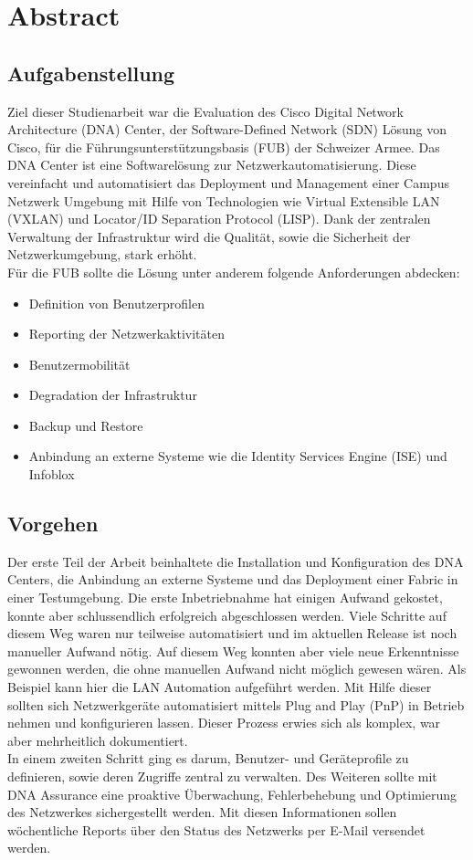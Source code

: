 \section{Abstract} 

\subsection{Aufgabenstellung} \label{Abstract}
Ziel dieser Studienarbeit war die Evaluation des Cisco Digital Network Architecture (DNA) Center, der Software-Defined Network (SDN) Lösung von Cisco, für die Führungsunterstützungsbasis (FUB) der Schweizer Armee. Das DNA Center ist eine Softwarelösung zur Netzwerkautomatisierung. Diese vereinfacht und automatisiert das Deployment und Management einer Campus Netzwerk Umgebung mit Hilfe von Technologien wie Virtual Extensible LAN (VXLAN) und Locator/ID Separation Protocol (LISP). Dank der zentralen Verwaltung der Infrastruktur wird die Qualität, sowie die Sicherheit der Netzwerkumgebung, stark erhöht.\\
Für die FUB sollte die Lösung unter anderem folgende Anforderungen abdecken:
\begin{itemize}
	\item Definition von Benutzerprofilen
	\item Reporting der Netzwerkaktivitäten
	\item Benutzermobilität
	\item Degradation der Infrastruktur
	\item Backup und Restore
	\item Anbindung an externe Systeme wie die Identity Services Engine (ISE) und Infoblox
\end{itemize}

\subsection{Vorgehen}
Der erste Teil der Arbeit beinhaltete die Installation und Konfiguration des DNA Centers, die Anbindung an externe Systeme und das Deployment einer Fabric in einer Testumgebung. Die erste Inbetriebnahme hat einigen Aufwand gekostet, konnte aber schlussendlich erfolgreich abgeschlossen werden. Viele Schritte auf diesem Weg waren nur teilweise automatisiert und im aktuellen Release ist noch manueller Aufwand nötig. Auf diesem Weg konnten aber viele neue Erkenntnisse gewonnen werden, die ohne manuellen Aufwand nicht möglich gewesen wären. Als Beispiel kann hier die LAN Automation aufgeführt werden. Mit Hilfe dieser sollten sich Netzwerkgeräte automatisiert mittels Plug and Play (PnP) in Betrieb nehmen und konfigurieren lassen. Dieser Prozess erwies sich als komplex, war aber mehrheitlich dokumentiert. \\
In einem zweiten Schritt ging es darum, Benutzer- und Geräteprofile zu definieren, sowie deren Zugriffe zentral zu verwalten. Des Weiteren sollte mit DNA Assurance eine proaktive Überwachung, Fehlerbehebung und Optimierung des Netzwerkes sichergestellt werden. Mit diesen Informationen sollen wöchentliche Reports über den Status des Netzwerks per E-Mail versendet werden.

